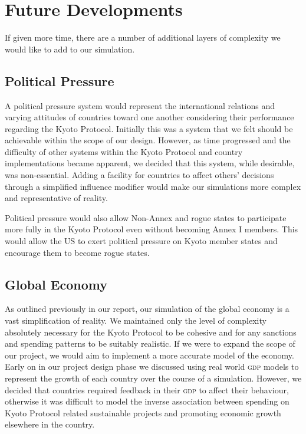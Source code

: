 \section{Future Developments}

If given more time, there are a number of additional layers of complexity we would like to add to our simulation. 

\subsection{Political Pressure}

A political pressure system would represent the international relations and varying attitudes of countries toward one another considering their performance regarding the Kyoto Protocol. Initially this was a system that we felt should be achievable within the scope of our design. However, as time progressed and the difficulty of other systems within the Kyoto Protocol and country implementations became apparent, we decided that this system, while desirable, was non-essential. Adding a facility for countries to affect others' decisions through a simplified influence modifier would make our simulations more complex and representative of reality.

Political pressure would also allow Non-Annex and rogue states to participate more fully in the Kyoto Protocol even without becoming Annex I members. This would allow the US to exert political pressure on Kyoto member states and encourage them to become rogue states.

\subsection{Global Economy}

As outlined previously in our report, our simulation of the global economy is a vast simplification of reality. We maintained only the level of complexity absolutely necessary for the Kyoto Protocol to be cohesive and for any sanctions and spending patterns to be suitably realistic. If we were to expand the scope of our project, we would aim to implement a more accurate model of the economy. Early on in our project design phase we discussed using real world \textsc{gdp} models to represent the growth of each country over the course of a simulation. However, we decided that countries required feedback in their \textsc{gdp} to affect their behaviour, otherwise it was difficult to model the inverse association between spending on Kyoto Protocol related sustainable projects and promoting economic growth elsewhere in the country.

